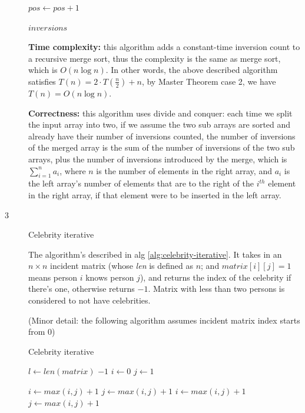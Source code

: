 \documentclass{article}
\begin{document}
\begin{description}
\begin{algorithm}[h]
\begin{algorithmic}[1]
        \State $pos \gets pos + 1$
      \EndWhile

      \State \Return $inversions$
    \EndFunction

    \end{algorithmic}
  \end{algorithm}
  
  \textbf{Time complexity:} this algorithm adds a constant-time inversion count to a recursive merge sort, thus the complexity is the same as merge sort, which is $O(n\log n)$. In other words, the above described algorithm satisfies $T(n) = 2 \cdot T(\frac{n}{2}) + n$, by Master Theorem case 2, we have $T(n) = O(n\log{n})$.

  \textbf{Correctness:} this algorithm uses divide and conquer: each time we split the input array into two, if we assume the two sub arrays are sorted and already have their number of inversions counted, the number of inversions of the merged array is the sum of the number of inversions of the two sub arrays, plus the number of inversions introduced by the merge, which is $\sum_{i=1}^{n}{a_i}$, where $n$ is the number of elements in the right array, and $a_i$ is the left array's number of elements that are to the right of the $i^{th}$ element in the right array, if that element were to be inserted in the left array.

\item[3]{Celebrity iterative}

  The algorithm's described in alg \ref{alg:celebrity-iterative}. It takes in an $n \times n$ incident matrix (whose \textit{len} is defined as $n$; and $matrix[i][j] = 1$ means person $i$ knows person $j$), and returns the index of the celebrity if there's one, otherwise returns $-1$. Matrix with less than two persons is considered to not have celebrities.

  (Minor detail: the following algorithm assumes incident matrix index starts from 0)

  \begin{algorithm}[h]
  \caption{Celebrity iterative}
  \label{alg:celebrity-iterative}
    \begin{algorithmic}[1]
      \State $l \gets len(matrix)$
        \State \Return $-1$
      \EndIf
      \State $i \gets 0$
      \State $j \gets 1$

          \State $i \gets max(i,j) + 1$
          \State $j \gets max(i,j) + 1$
        \Else
          \State $i \gets max(i,j) + 1$
          \State $j \gets max(i,j) + 1$
        \EndIf
      \EndWhile


\end{algorithmic}
\end{algorithm}
\end{description}
\end{document}
